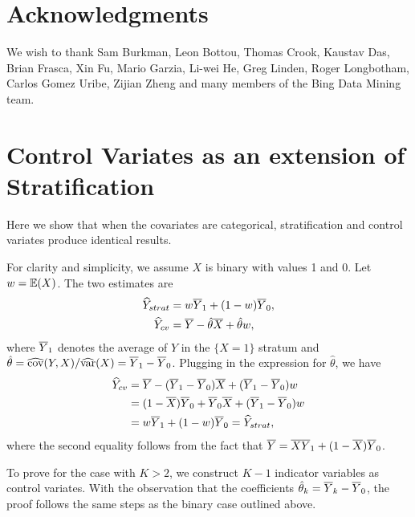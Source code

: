 \documentclass{sig-alternate}
\begin{document}
\section{Acknowledgments}
We wish to thank Sam Burkman, Leon Bottou, Thomas Crook, Kaustav Das, Brian Frasca, Xin Fu, Mario Garzia, Li-wei He, Greg Linden, Roger Longbotham, Carlos Gomez Uribe, Zijian Zheng and many members of the Bing Data Mining team.
%

%
%
\newpage
\appendix

\section{Control Variates as an extension of Stratification}\label{appendix:combo}
Here we show that when the covariates are categorical, stratification and control variates produce identical results.

For clarity and simplicity, we assume $X$ is binary with values 1 and 0. Let $w=\mathbb{E}(X)$. The two estimates are
\begin{align*}
\widehat{Y}_{strat}&=w\overline{Y}_1 + (1-w)\overline{Y}_0,\\
\widehat{Y}_{cv} &= \overline{Y} -\hat{\theta}\overline{X} +\hat\theta w,
\end{align*}
where $\overline{Y}_1$ denotes the average of $Y$ in the $\{X=1\}$ stratum and $\hat\theta=\widehat{\mathrm{cov}}(Y,X)/\widehat{\mathrm{var}}(X)=\overline{Y}_1 -\overline{Y}_0$. 
Plugging in the expression for $\hat\theta$, we have
\begin{align*}
\widehat{Y}_{cv} &= \overline{Y} -(\overline{Y}_1 -\overline{Y}_0)\overline{X} +(\overline{Y}_1 -\overline{Y}_0)w\\
&= (1-\overline{X})\overline{Y}_0 + \overline{Y}_0\overline{X} +(\overline{Y}_1 -\overline{Y}_0)w\\
& = w\overline{Y}_1 + (1-w)\overline{Y}_0 = \widehat{Y}_{strat},
\end{align*}
where the second equality follows from the fact that $\overline{Y}=\overline{X}\overline{Y}_1 + (1-\overline{X})\overline{Y}_0$. 

To prove for the case with $K>2$, we construct $K-1$ indicator variables as control variates. 
With the observation that the coefficients $\hat\theta_k=\overline{Y}_k-\overline{Y}_0$, the proof follows the same steps as the binary case outlined above.   
\end{document}
